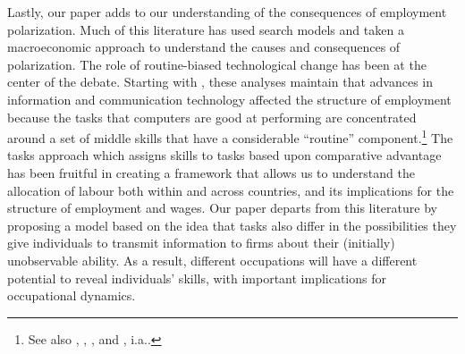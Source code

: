 Lastly, our paper adds to our understanding of the consequences of employment polarization. Much of this literature has used search models and taken a macroeconomic approach to understand the causes and consequences of polarization. The role of routine-biased technological change has been at the center of the debate. Starting with \citet{Autor2003Skill}, these analyses maintain that advances in information and communication technology affected the structure of employment because the tasks that computers are good at performing are concentrated around a set of middle skills that have a considerable ``routine'' component.\footnote{See also \citet{Goos2014Explaining}, \citet{Caines2017Complex}, \citet{Lordan2018People}, and \citet{Acemoglu2020Robots}, i.a..} The tasks approach which assigns skills to tasks based upon comparative advantage has been fruitful in creating a framework that allows us to understand the allocation of labour both within and across countries, and its implications for the structure of employment and wages. Our paper departs from this literature by proposing a model based on the idea that tasks also differ in the possibilities they give individuals to transmit information to firms about their (initially) unobservable ability. As a result, different occupations will have a different potential to reveal individuals' skills, with important implications for occupational dynamics.

